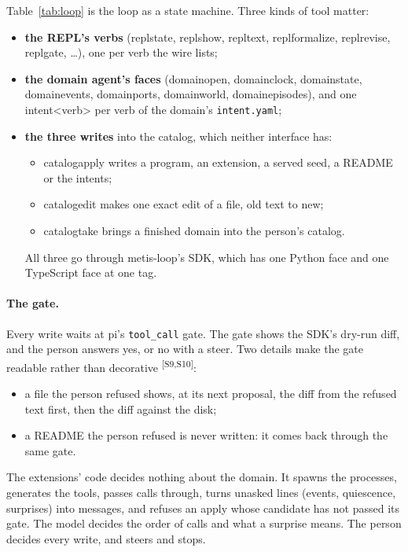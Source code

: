 \documentclass[11pt]{article}
\newcommand{\tool}[1]{{\ttfamily\begingroup\def\_{\textunderscore\allowbreak}#1\endgroup}}
\newcommand{\src}[1]{\textsuperscript{[#1]}}
\begin{document}
Table~\ref{tab:loop} is the loop as a state machine. Three kinds of tool
matter:
\begin{itemize}[nosep]
\item \textbf{the REPL's verbs} (\tool{repl\_state}, \tool{repl\_show},
  \tool{repl\_text}, \tool{repl\_formalize}, \tool{repl\_revise},
  \tool{repl\_gate}, \ldots), one per verb the wire lists;
\item \textbf{the domain agent's faces} (\tool{domain\_open},
  \tool{domain\_clock}, \tool{domain\_state}, \tool{domain\_events},
  \tool{domain\_ports}, \tool{domain\_world}, \tool{domain\_episodes}),
  and one \tool{intent\_<verb>} per verb of the domain's
  \texttt{intent.yaml};
\item \textbf{the three writes} into the catalog, which neither interface
  has:
  \begin{itemize}[nosep]
  \item \tool{catalog\_apply} writes a program, an extension, a served
    seed, a README or the intents;
  \item \tool{catalog\_edit} makes one exact edit of a file, old text to
    new;
  \item \tool{catalog\_take} brings a finished domain into the person's
    catalog.
  \end{itemize}
  All three go through metis-loop's SDK, which has one Python face and one
  TypeScript face at one tag.
\end{itemize}

\paragraph{The gate.} Every write waits at pi's \texttt{tool\_call} gate.
The gate shows the SDK's dry-run diff, and the person answers yes, or no
with a steer. Two details make the gate readable rather than decorative
\src{S9,S10}:
\begin{itemize}[nosep]
\item a file the person refused shows, at its next proposal, the diff
  from the refused text first, then the diff against the disk;
\item a README the person refused is never written: it comes back through
  the same gate.
\end{itemize}
The extensions' code decides nothing about the domain. It spawns the
processes, generates the tools, passes calls through, turns unasked lines
(events, quiescence, surprises) into messages, and refuses an apply whose
candidate has not passed its gate. The model decides the order of calls
and what a surprise means. The person decides every write, and steers and
stops.
\end{document}
